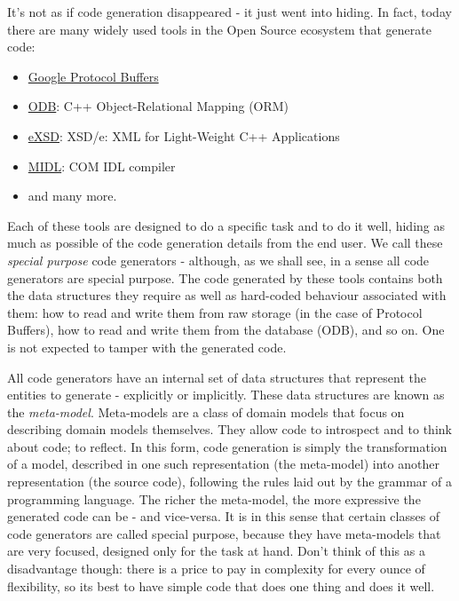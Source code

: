 \documentclass[11pt]{article}
\begin{document}
It's not as if code generation disappeared - it just went into
hiding. In fact, today there are many widely used tools in the Open
Source ecosystem that generate code:

\begin{itemize}
\item \href{https://developers.google.com/protocol-buffers/}{Google Protocol Buffers}
\item \href{http://www.codesynthesis.com/products/odb/}{ODB}: C++ Object-Relational Mapping (ORM)
\item \href{http://www.codesynthesis.com/products/xsde/}{eXSD}: XSD/e: XML for Light-Weight C++ Applications
\item \href{http://msdn.microsoft.com/en-us/library/windows/desktop/aa367300(v\%3Dvs.85).aspx}{MIDL}: COM IDL compiler
\item and many more.
\end{itemize}

Each of these tools are designed to do a specific task and to do it
well, hiding as much as possible of the code generation details from
the end user. We call these \emph{special purpose} code generators -
although, as we shall see, in a sense all code generators are special
purpose. The code generated by these tools contains both the data
structures they require as well as hard-coded behaviour associated
with them: how to read and write them from raw storage (in the case of
Protocol Buffers), how to read and write them from the database (ODB),
and so on. One is not expected to tamper with the generated code.

All code generators have an internal set of data structures that
represent the entities to generate - explicitly or implicitly. These
data structures are known as the \emph{meta-model}. Meta-models are a class
of domain models that focus on describing domain models
themselves. They allow code to introspect and to think about code; to
reflect. In this form, code generation is simply the transformation of
a model, described in one such representation (the meta-model) into
another representation (the source code), following the rules laid out
by the grammar of a programming language. The richer the meta-model,
the more expressive the generated code can be - and vice-versa. It is
in this sense that certain classes of code generators are called
special purpose, because they have meta-models that are very focused,
designed only for the task at hand. Don't think of this as a
disadvantage though: there is a price to pay in complexity for every
ounce of flexibility, so its best to have simple code that does one
thing and does it well.
\end{document}
